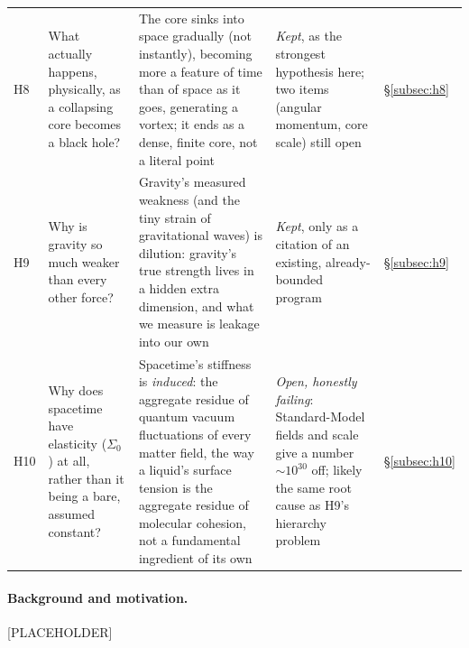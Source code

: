 \documentclass[12pt, a4paper]{article}
\begin{document}
\begin{longtable}{@{}>{\raggedright\arraybackslash}p{1.3cm}>{\raggedright\arraybackslash}p{3.3cm}>{\raggedright\arraybackslash}p{4.0cm}>{\raggedright\arraybackslash}p{2.3cm}>{\raggedright\arraybackslash}p{1.3cm}@{}}
H8 & What actually happens, physically, as a collapsing core becomes a black hole? & The core sinks into space gradually (not instantly), becoming more a feature of time than of space as it goes, generating a vortex; it ends as a dense, finite core, not a literal point & \emph{Kept}, as the strongest hypothesis here; two items (angular momentum, core scale) still open & \S\ref{subsec:h8} \\
H9 & Why is gravity so much weaker than every other force? & Gravity's measured weakness (and the tiny strain of gravitational waves) is dilution: gravity's true strength lives in a hidden extra dimension, and what we measure is leakage into our own & \emph{Kept}, only as a citation of an existing, already-bounded program & \S\ref{subsec:h9} \\
H10 & Why does spacetime have elasticity ($\Sigma_0$) at all, rather than it being a bare, assumed constant? & Spacetime's stiffness is \emph{induced}: the aggregate residue of quantum vacuum fluctuations of every matter field, the way a liquid's surface tension is the aggregate residue of molecular cohesion, not a fundamental ingredient of its own & \emph{Open, honestly failing}: Standard-Model fields and scale give a number $\sim10^{30}$ off; likely the same root cause as H9's hierarchy problem & \S\ref{subsec:h10} \\ \hline
\end{longtable}

\paragraph{Background and motivation.}
[PLACEHOLDER]
\end{document}
